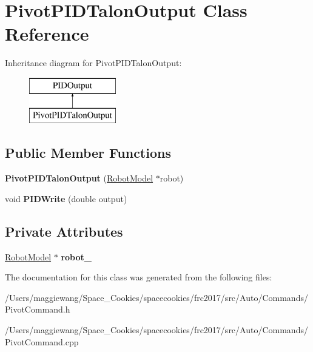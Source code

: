 \hypertarget{class_pivot_p_i_d_talon_output}{}\section{Pivot\+P\+I\+D\+Talon\+Output Class Reference}
\label{class_pivot_p_i_d_talon_output}
Inheritance diagram for Pivot\+P\+I\+D\+Talon\+Output\+:\begin{figure}[H]
\begin{center}
\leavevmode
\includegraphics[height=2.000000cm]{class_pivot_p_i_d_talon_output}
\end{center}
\end{figure}
\subsection*{Public Member Functions}
\begin{DoxyCompactItemize}
\item 
\mbox{\label{class_pivot_p_i_d_talon_output_ac7dff318a32bf616f397f6edf642b17e}} 
{\bfseries Pivot\+P\+I\+D\+Talon\+Output} (\hyperlink{class_robot_model}{Robot\+Model} $\ast$robot)
\item 
\mbox{\label{class_pivot_p_i_d_talon_output_a8a2c7a13ef615ad01d00fecc6a16f715}} 
void {\bfseries P\+I\+D\+Write} (double output)
\end{DoxyCompactItemize}
\subsection*{Private Attributes}
\begin{DoxyCompactItemize}
\item 
\mbox{\label{class_pivot_p_i_d_talon_output_a21f494514211fabf65c2615dce434db4}} 
\hyperlink{class_robot_model}{Robot\+Model} $\ast$ {\bfseries robot\+\_\+}
\end{DoxyCompactItemize}


The documentation for this class was generated from the following files\+:\begin{DoxyCompactItemize}
\item 
/\+Users/maggiewang/\+Space\+\_\+\+Cookies/spacecookies/frc2017/src/\+Auto/\+Commands/Pivot\+Command.\+h\item 
/\+Users/maggiewang/\+Space\+\_\+\+Cookies/spacecookies/frc2017/src/\+Auto/\+Commands/Pivot\+Command.\+cpp\end{DoxyCompactItemize}
